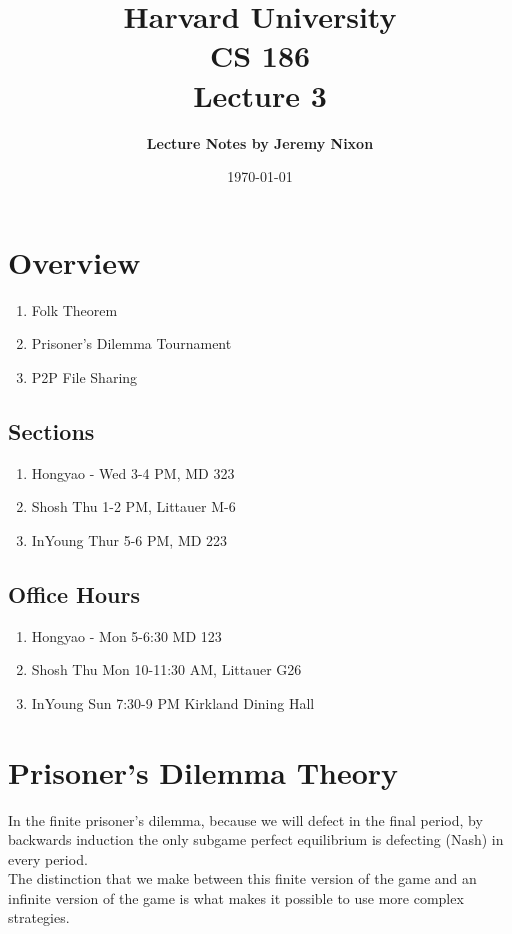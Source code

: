 \documentclass[12pt]{article}   	%
\title{\bf \large Harvard University\\ CS 186\\ \vspace{0.15in} Lecture 3}
\author{ \bf \large Lecture Notes by  Jeremy Nixon}
\date{\today}
\begin{document}
\maketitle
\section{Overview}
\begin{enumerate}
\item Folk Theorem
\item Prisoner's Dilemma Tournament
\item P2P File Sharing

\end{enumerate}

\subsection{Sections}
\begin{enumerate}
\item Hongyao - Wed 3-4 PM, MD 323
\item Shosh Thu 1-2 PM, Littauer M-6
\item InYoung Thur 5-6 PM, MD 223
\end{enumerate}

\subsection{Office Hours}
\begin{enumerate}
\item Hongyao - Mon 5-6:30 MD 123
\item Shosh Thu Mon 10-11:30 AM, Littauer G26
\item InYoung Sun 7:30-9 PM Kirkland Dining Hall
\end{enumerate}
\section{Prisoner's Dilemma Theory}

In the finite prisoner's dilemma, because we will defect in the final period, by backwards induction the only subgame perfect equilibrium is defecting (Nash) in every period.\\

\noindent
The distinction that we make between this finite version of the game and an infinite version of the game is what makes it possible to use more complex strategies.\\
\end{document}
